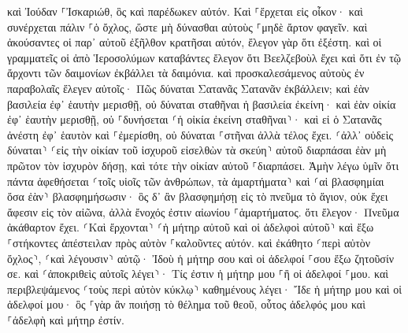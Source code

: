 \documentclass[twoside, 9pt]{extreport}
\begin{document}
καὶ Ἰούδαν ⸀Ἰσκαριώθ, ὃς καὶ παρέδωκεν αὐτόν. 
Καὶ ⸀ἔρχεται εἰς οἶκον· καὶ συνέρχεται πάλιν ⸀ὁ ὄχλος, ὥστε μὴ δύνασθαι αὐτοὺς ⸀μηδὲ ἄρτον φαγεῖν. 
καὶ ἀκούσαντες οἱ παρ᾽ αὐτοῦ ἐξῆλθον κρατῆσαι αὐτόν, ἔλεγον γὰρ ὅτι ἐξέστη. 
καὶ οἱ γραμματεῖς οἱ ἀπὸ Ἱεροσολύμων καταβάντες ἔλεγον ὅτι Βεελζεβοὺλ ἔχει καὶ ὅτι ἐν τῷ ἄρχοντι τῶν δαιμονίων ἐκβάλλει τὰ δαιμόνια. 
καὶ προσκαλεσάμενος αὐτοὺς ἐν παραβολαῖς ἔλεγεν αὐτοῖς· Πῶς δύναται Σατανᾶς Σατανᾶν ἐκβάλλειν; 
καὶ ἐὰν βασιλεία ἐφ᾽ ἑαυτὴν μερισθῇ, οὐ δύναται σταθῆναι ἡ βασιλεία ἐκείνη· 
καὶ ἐὰν οἰκία ἐφ᾽ ἑαυτὴν μερισθῇ, οὐ ⸀δυνήσεται ⸂ἡ οἰκία ἐκείνη σταθῆναι⸃· 
καὶ εἰ ὁ Σατανᾶς ἀνέστη ἐφ᾽ ἑαυτὸν καὶ ⸀ἐμερίσθη, οὐ δύναται ⸀στῆναι ἀλλὰ τέλος ἔχει. 
⸂ἀλλ᾽ οὐδεὶς δύναται⸃ ⸂εἰς τὴν οἰκίαν τοῦ ἰσχυροῦ εἰσελθὼν τὰ σκεύη⸃ αὐτοῦ διαρπάσαι ἐὰν μὴ πρῶτον τὸν ἰσχυρὸν δήσῃ, καὶ τότε τὴν οἰκίαν αὐτοῦ ⸀διαρπάσει. 
Ἀμὴν λέγω ὑμῖν ὅτι πάντα ἀφεθήσεται ⸂τοῖς υἱοῖς τῶν ἀνθρώπων, τὰ ἁμαρτήματα⸃ καὶ ⸂αἱ βλασφημίαι ὅσα ἐὰν⸃ βλασφημήσωσιν· 
ὃς δ᾽ ἂν βλασφημήσῃ εἰς τὸ πνεῦμα τὸ ἅγιον, οὐκ ἔχει ἄφεσιν εἰς τὸν αἰῶνα, ἀλλὰ ἔνοχός ἐστιν αἰωνίου ⸀ἁμαρτήματος. 
ὅτι ἔλεγον· Πνεῦμα ἀκάθαρτον ἔχει. 
⸂Καὶ ἔρχονται⸃ ⸂ἡ μήτηρ αὐτοῦ καὶ οἱ ἀδελφοὶ αὐτοῦ⸃ καὶ ἔξω ⸀στήκοντες ἀπέστειλαν πρὸς αὐτὸν ⸀καλοῦντες αὐτόν. 
καὶ ἐκάθητο ⸂περὶ αὐτὸν ὄχλος⸃, ⸂καὶ λέγουσιν⸃ αὐτῷ· Ἰδοὺ ἡ μήτηρ σου καὶ οἱ ἀδελφοί ⸀σου ἔξω ζητοῦσίν σε. 
καὶ ⸂ἀποκριθεὶς αὐτοῖς λέγει⸃· Τίς ἐστιν ἡ μήτηρ μου ⸀ἢ οἱ ἀδελφοί ⸀μου. 
καὶ περιβλεψάμενος ⸂τοὺς περὶ αὐτὸν κύκλῳ⸃ καθημένους λέγει· Ἴδε ἡ μήτηρ μου καὶ οἱ ἀδελφοί μου· 
ὃς ⸀γὰρ ἂν ποιήσῃ τὸ θέλημα τοῦ θεοῦ, οὗτος ἀδελφός μου καὶ ⸀ἀδελφὴ καὶ μήτηρ ἐστίν. 
\end{document}
